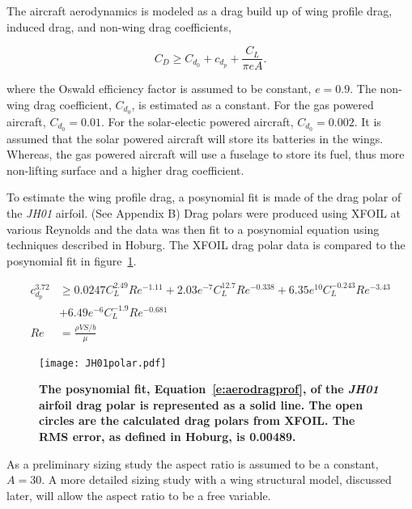 \documentclass[]{aiaa-tc}%
\begin{document}
The aircraft aerodynamics is modeled as a drag build up of wing profile drag, induced drag, and non-wing drag coefficients, 

\begin{equation}
    \label{e:aerodragb}
    C_D \geq C_{d_0} + c_{d_p} + \frac{C_L}{\pi e A}.
    \end{equation}

where the Oswald efficiency factor is assumed to be constant, $e=0.9$. 
The non-wing drag coefficient, $C_{d_0}$, is estimated as a constant.  
For the gas powered aircraft, $C_{d_0} = 0.01$.  
For the solar-electic powered aircraft, $C_{d_0} = 0.002$.  
It is assumed that the solar powered aircraft will store its batteries in the wings. 
Whereas, the gas powered aircraft will use a fuselage to store its fuel, thus more non-lifting surface and a higher drag coefficient.\cite{raymer}
    
    To estimate the wing profile drag, a posynomial fit is made of the drag polar of the \emph{JH01} airfoil. (See Appendix B) 
    Drag polars were produced using XFOIL at various Reynolds and the data was then fit to a posynomial equation using techniques described in Hoburg.\cite{fitting}
    The XFOIL drag polar data is compared to the posynomial fit in figure~\ref{f:JH01polar}.

    \begin{align}
        \label{e:aerodragprof}
        c_{d_p}^{3.72} &\geq 0.0247C_L^{2.49}Re^{-1.11} + 2.03e^{-7}C_L^{12.7}Re^{-0.338} + 6.35e^{10}C_L^{-0.243}Re^{-3.43} \\
                       &+ 6.49e^{-6}C_L^{-1.9}Re^{-0.681}\\
        Re &= \frac{\rho V S/b}{\mu}
    \end{align}

\begin{figure}[H]
	\begin{center}
	\texttt{[image: JH01polar.pdf]}
    \caption{ \textbf{ The posynomial fit, Equation~\eqref{e:aerodragprof}, of the \emph{JH01} airfoil drag polar is represented as a solid line.  The open circles are the calculated drag polars from XFOIL. The RMS error, as defined in Hoburg\cite{fitting}, is 0.00489.} }
	\label{f:JH01polar}
	\end{center}
\end{figure}

As a preliminary sizing study the aspect ratio is assumed to be a constant, $A = 30$.  A more detailed sizing study with a wing structural model, discussed later, will allow the aspect ratio to be a free variable. 
\end{document}
